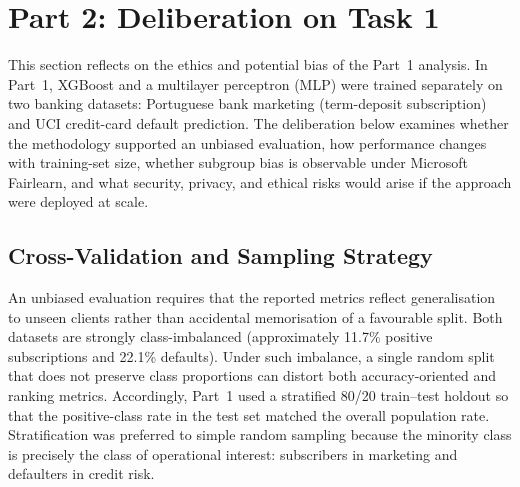 
\section{Part 2: Deliberation on Task 1}
\label{sec:part2-deliberation}

This section reflects on the ethics and potential bias of the Part~1 analysis.
In Part~1, XGBoost and a multilayer perceptron (MLP) were trained separately on
two banking datasets: Portuguese bank marketing (term-deposit subscription) and
UCI credit-card default prediction. The deliberation below examines whether the
methodology supported an unbiased evaluation, how performance changes with
training-set size, whether subgroup bias is observable under Microsoft Fairlearn,
and what security, privacy, and ethical risks would arise if the approach were
deployed at scale.

\subsection{Cross-Validation and Sampling Strategy}
\label{sec:part2-cv}

An unbiased evaluation requires that the reported metrics reflect generalisation
to unseen clients rather than accidental memorisation of a favourable split.
Both datasets are strongly class-imbalanced (approximately 11.7\% positive
subscriptions and 22.1\% defaults). Under such imbalance, a single random split
that does not preserve class proportions can distort both accuracy-oriented and
ranking metrics. Accordingly, Part~1 used a stratified 80/20 train--test holdout
so that the positive-class rate in the test set matched the overall population
rate. Stratification was preferred to simple random sampling because the minority
class is precisely the class of operational interest: subscribers in marketing
and defaulters in credit risk.

